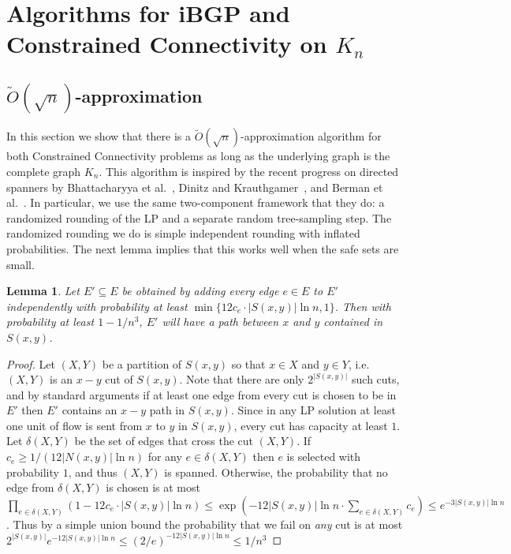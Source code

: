 \documentclass[11pt,letterpaper]{article}
\newtheorem{lemma}[theorem]{Lemma}
\theoremstyle{definition}
\begin{document}
\section{Algorithms for iBGP and Constrained Connectivity on $K_n$} \label{sec:CC_Kn}


\subsection{$\tilde{O}(\sqrt{n})$-approximation}
In this section we show that there is a $\tilde{O}(\sqrt{n})$-approximation algorithm for both Constrained Connectivity problems as long as the underlying graph is the complete graph $K_n$.  This algorithm is inspired by the recent progress on directed spanners by Bhattacharyya et al.~\cite{BGJRW09}, Dinitz and Krauthgamer~\cite{DK11}, and Berman et al.~\cite{BBMRY11}.  In particular, we use the same two-component framework that they do: a randomized rounding of the LP and a separate random tree-sampling step.  The randomized rounding we do is simple independent rounding with inflated probabilities.  The next lemma implies that this works well when the safe sets are small.

\begin{lemma} \label{lem:sample}
Let $E' \subseteq E$ be obtained by adding every edge $e \in E$  to $E'$ independently with probability at least $\min\{12c_e \cdot |S(x,y)| \ln n, 1\}$.  Then with probability at least $1-1/n^3$, $E'$ will have a path between $x$ and $y$ contained in $S(x,y)$.
\end{lemma}
\begin{proof}
Let $(X,Y)$ be a partition of $S(x,y)$ so that $x \in X$ and $y \in Y$, i.e.~$(X,Y)$ is an $x-y$ cut of $S(x,y)$.  Note that there are only $2^{|S(x,y)|}$ such cuts, and by standard arguments if at least one edge from every cut is chosen to be in $E'$ then $E'$ contains an $x-y$ path in $S(x,y)$.  Since in any LP solution at least one unit of flow is sent from $x$ to $y$ in $S(x,y)$, every cut has capacity at least $1$.  Let $\delta(X,Y)$ be the set of edges that cross the cut $(X,Y)$.  If $c_e \geq 1/ (12 |N(x,y)| \ln n)$ for any $e \in \delta(X,Y)$ then $e$ is selected with probability $1$, and thus $(X,Y)$ is spanned.  Otherwise, the probability that no edge from $\delta(X,Y)$ is chosen is at most $\prod_{e \in \delta(X,Y)} (1-12 c_e \cdot |S(x,y)|\ln n) \leq \exp(-12|S(x,y)|\ln n \cdot \sum_{e \in \delta(X,Y)} c_e) \leq e^{-3|S(x,y)| \ln n}$.  Thus by a simple union bound the probability that we fail on \emph{any} cut is at most $2^{|S(x,y)|} e^{-12|S(x,y)| \ln n} \leq (2/e)^{-12|S(x,y)| \ln n} \leq 1/n^3$
\end{proof}
\end{document}
